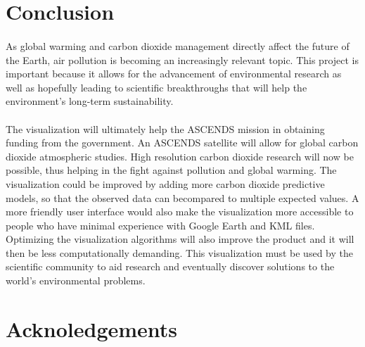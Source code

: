 \documentclass[12pt,letterpaper]{report}
\begin{document}
 \section*{Conclusion}
  \paragraph{}
   As global warming and carbon dioxide management directly affect the future of the Earth, air pollution is becoming an increasingly relevant topic.  This project is important because it allows for the advancement of environmental research as well as hopefully leading to scientific breakthroughs that will help the environment's long-term sustainability.
  \paragraph{}
   The visualization will ultimately help the ASCENDS mission in obtaining funding from the government.  An ASCENDS satellite will allow for global carbon dioxide atmospheric studies.  High resolution carbon dioxide research will now be possible, thus helping in the fight against pollution and global warming.  The visualization could be improved by adding more carbon dioxide predictive models, so that the observed data can becompared to multiple expected values.  A more friendly user interface would also make the visualization more accessible to people who have minimal experience with Google Earth and KML files.  Optimizing the visualization algorithms will also improve the product and it will then be less computationally demanding.  This visualization must be used by the scientific community to aid research and eventually discover solutions to the world's environmental problems.

 \section*{Acknoledgements}
\end{document}
